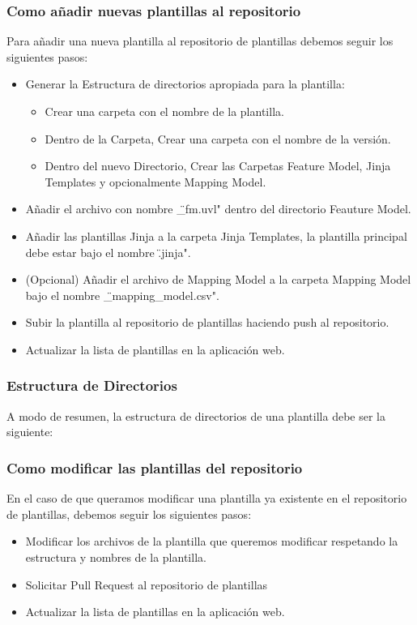 \documentclass[12pt, a4paper, twoside]{article}
\begin{document}
\begin{umaappendices}
	\subsubsection{Como añadir nuevas plantillas al repositorio}
	Para añadir una nueva plantilla al repositorio de plantillas debemos seguir los siguientes pasos:
	\begin{itemize}
		\item Generar la Estructura de directorios apropiada para la plantilla:
		\begin{itemize}
			\item Crear una carpeta con el nombre de la plantilla.
			\item Dentro de la Carpeta, Crear una carpeta con el nombre de la versión.
			\item Dentro del nuevo Directorio, Crear las Carpetas Feature Model, Jinja Templates y opcionalmente Mapping Model.
		\end{itemize}
		\item Añadir el archivo con nombre \"<Nombre de la Plantilla>\_fm.uvl" dentro del directorio Feauture Model.
		\item Añadir las plantillas Jinja a la carpeta Jinja Templates, la plantilla principal debe estar bajo el nombre \"<Nombre de la Plantilla>.jinja".
		\item (Opcional) Añadir el archivo de Mapping Model  a la carpeta Mapping Model bajo el nombre \"<Nombre de la Plantilla>\_mapping\_model.csv".
		\item Subir la plantilla al repositorio de plantillas haciendo push al repositorio.
		\item Actualizar la lista de plantillas en la aplicación web.
	\end{itemize}
	\subsubsection{Estructura de Directorios}
	 A modo de resumen, la estructura de directorios de una plantilla debe ser la siguiente:



	\subsubsection{Como modificar las plantillas del repositorio}
	En el caso de que queramos modificar una plantilla ya existente en el repositorio de plantillas, debemos seguir los siguientes pasos:
	\begin{itemize}
		\item Modificar los archivos de la plantilla que queremos modificar respetando la estructura y nombres de la plantilla.
		\item Solicitar Pull Request al repositorio de plantillas
		\item Actualizar la lista de plantillas en la aplicación web.
	\end{itemize}


\end{umaappendices}
\end{document}
